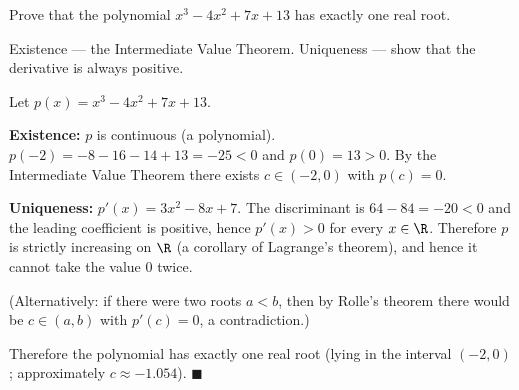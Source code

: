 
\begin{question}
Prove that the polynomial $x^3-4x^2+7x+13$ has exactly one real root.
\end{question}

\begin{hint}
Existence — the Intermediate Value Theorem. Uniqueness — show that the derivative is always positive.
\end{hint}

\begin{solution}
Let $p(x)=x^3-4x^2+7x+13$.

\textbf{Existence:} $p$ is continuous (a polynomial). $p(-2)=-8-16-14+13=-25<0$ and $p(0)=13>0$. By the Intermediate Value Theorem there exists $c\in(-2,0)$ with $p(c)=0$.

\textbf{Uniqueness:} $p'(x)=3x^2-8x+7$. The discriminant is $64-84=-20<0$ and the leading coefficient is positive, hence $p'(x)>0$ for every $x\in\R$. Therefore $p$ is strictly increasing on $\R$ (a corollary of Lagrange's theorem), and hence it cannot take the value $0$ twice.

(Alternatively: if there were two roots $a<b$, then by Rolle's theorem there would be $c\in(a,b)$ with $p'(c)=0$, a contradiction.)

Therefore the polynomial has exactly one real root (lying in the interval $(-2,0)$; approximately $c\approx-1.054$). $\blacksquare$
\end{solution}
